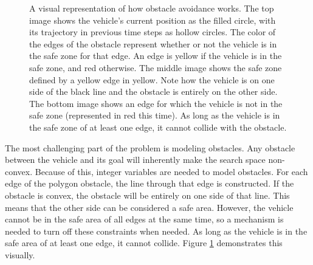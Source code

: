 \begin{figure}[!t]
    \centering
    \hfil
     \hfil
    \caption{A visual representation of how obstacle avoidance works. The top image shows the vehicle's current position as the filled circle, with its trajectory in previous time steps as hollow circles. The color of the edges of the obstacle represent whether or not the vehicle is in the safe zone for that edge. An edge is yellow if the vehicle is in the safe zone, and red otherwise. The middle image shows the safe zone defined by a yellow edge in yellow. Note how the vehicle is on one side of the black line and the obstacle is entirely on the other side. The bottom image shows an edge for which the vehicle is not in the safe zone (represented in red this time). As long as the vehicle is in the safe zone of at least one edge, it cannot collide with the obstacle.}\label{fig:obs}
\end{figure}
The most challenging part of the problem is modeling obstacles. Any obstacle between the vehicle and its goal will inherently make the search space non-convex. Because of this, integer variables are needed to model obstacles. For each edge of the polygon obstacle, the line through that edge is constructed. If the obstacle is convex, the obstacle will be entirely on one side of that line. This means that the other side can be considered a safe area. However, the vehicle cannot be in the safe area of all edges at the same time, so a mechanism is needed to turn off these constraints when needed. As long as the vehicle is in the safe area of at least one edge, it cannot collide.  Figure \ref{fig:obs} demonstrates this visually. \\
